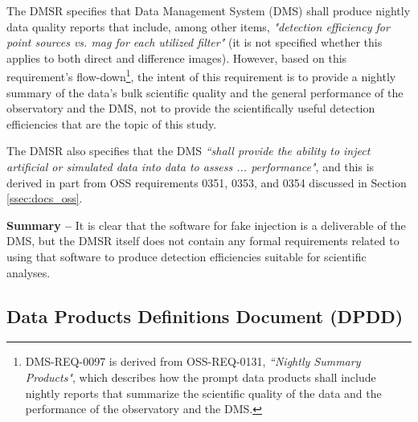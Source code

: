 \documentclass[DM,lsstdraft,toc]{lsstdoc}
\begin{document}
The DMSR  specifies that Data Management System (DMS) shall produce nightly data quality reports that include, among other items, {\it "detection efficiency for point sources vs. mag for each utilized filter"} (it is not specified whether this applies to both direct and difference images). However, based on this requirement's flow-down\footnote{DMS-REQ-0097 is derived from OSS-REQ-0131, {\it ``Nightly Summary Products"}, which describes how the prompt data products shall include nightly reports that summarize the scientific quality of the data and the performance of the observatory and the DMS.}, the intent of this requirement is to provide a nightly summary of the data's bulk scientific quality and the general performance of the observatory and the DMS, not to provide the scientifically useful detection efficiencies that are the topic of this study. 

The DMSR also specifies that the DMS {\it ``shall provide the ability to inject artificial or simulated data into data to assess ... performance"}, and this is derived in part from OSS requirements 0351, 0353, and 0354 discussed in Section \ref{ssec:docs_oss}.

{\bf Summary --} It is clear that the software for fake injection is a deliverable of the DMS, but the DMSR itself does not contain any formal requirements related to using that software to produce detection efficiencies suitable for scientific analyses. 



\subsection{Data Products Definitions Document (DPDD)}\label{ssec:docs_dpdd}
\end{document}
